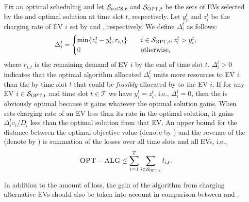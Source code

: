 Fix an optimal scheduling and let $\mathcal{S}_{\textsc{foCS},t}$ and $\mathcal{S}_{\textsc{OPT},t}$ be the sets of EVs selected by the \focs and optimal solution at time slot $t$, respectively. Let $y_{i}^t$ and $z_{i}^t$ be the charging rate of EV $i$ set by \focs and \opt, respectively. We define $\Delta_{i}^t$ as follows:
\begin{equation}
\label{eq:delta}
\Delta_{i}^t =
     \begin{cases}
       \min\{z_{i}^t-y_{i}^t,r_{i,t}\} &\quad i\in\mathcal{S}_{\textsc{OPT},t},z_{i}^t>y_{i}^t, \\
       0& \quad\text{otherwise},  \\
     \end{cases}
\end{equation}
where $r_{i,t}$ is the remaining demand of EV $i$ by the end of time slot $t$. $\Delta_{i}^t>0$ indicates that the optimal algorithm allocated $\Delta_{i}^t$ units more resources to EV $i$ than the \focs by time slot $t$ that could be \emph{feasibly} allocated by \focs to the EV $i$. If for any EV $i\in\mathcal{S}_{\textsc{OPT},t}$ and time slot $t\in\mathcal{T}$ we have $y_{i}^t=z_{i}^t$, i.e., $\Delta_{i}^t=0$, then the \focs is obviously optimal because it gains whatever the optimal solution gains.  When \focs sets charging rate of an EV less than its rate in the optimal solution, it gains $\Delta_{i}^t v_i/D_i$ less than the optimal solution from that EV. An upper bound for the distance between the optimal objective value (denote by \opt) and the revenue of the \focs (denote by \alg) is summation of the losses over all time slots and all EVs, i.e., 
\begin{equation}
\label{eq:optdist}
\textsc{OPT}-\textsc{ALG}\leq \sum_{t=1}^T\sum_{i\in\mathcal{S}_{\textsc{OPT},t}} l_{i,t}.
\end{equation}

In addition to the amount of loss, the gain of the algorithm from charging alternative EVs should also be taken into account in comparison between \opt and \alg. 

